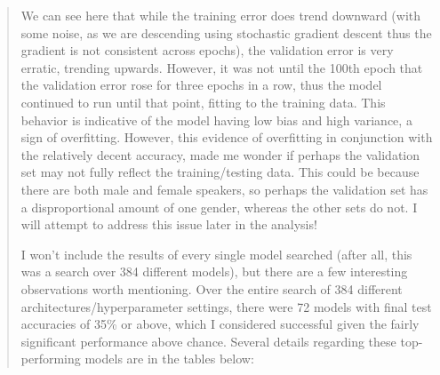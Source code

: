 \documentclass{article}
\begin{document}
\begin{quote}
	We can see here that while the training error does trend downward (with some noise, as we are descending using stochastic gradient descent thus the gradient is not consistent across epochs), the validation error is very erratic, trending upwards. However, it was not until the 100th epoch that the validation error rose for three epochs in a row, thus the model continued to run until that point, fitting to the training data. This behavior is indicative of the model having low bias and high variance, a sign of overfitting. However, this evidence of overfitting in conjunction with the relatively decent accuracy, made me wonder if perhaps the validation set may not fully reflect the training/testing data. This could be because there are both male and female speakers, so perhaps the validation set has a disproportional amount of one gender, whereas the other sets do not. I will attempt to address this issue later in the analysis!
	
	I won't include the results of every single model searched (after all, this was a search over 384 different models), but there are a few interesting observations worth mentioning. Over the entire search of 384 different architectures/hyperparameter settings, there were 72 models with final test accuracies of 35\% or above, which I considered successful given the fairly significant performance above chance. Several details regarding these top-performing models are in the tables below:
	

\end{quote}
\end{document}
